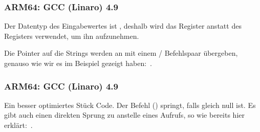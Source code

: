\subsubsection{ARM64: \NonOptimizing GCC (Linaro) 4.9}


Der Datentyp des Eingabewertes ist \Tint, deshalb wird das Register  anstatt des  Registers verwendet,
um ihn aufzunehmen.

Die Pointer auf die Strings werden an \puts mit einem / Befehlspaar übergeben, genauso wie wir es im
\q{\HelloWorldSectionName} Beispiel gezeigt haben:~.

\subsubsection{ARM64: \Optimizing GCC (Linaro) 4.9}


Ein besser optimiertes Stück Code. 
Der Befehl  () springt, falls  gleich null ist.
Es gibt auch einen direkten Sprung zu \puts anstelle eines Aufrufs, so wie bereits hier
erklärt:~.

